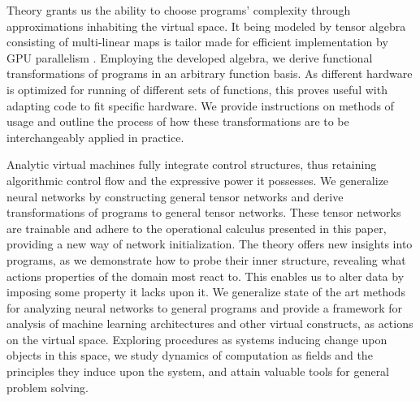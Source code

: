 \documentclass{article}
\begin{document}
Theory grants us the ability to choose programs' complexity through approximations inhabiting the virtual space. It being modeled by tensor algebra consisting of multi-linear maps is tailor made for efficient implementation by GPU parallelism \cite{TensorGPU}. Employing the developed algebra, we derive functional transformations of programs in an arbitrary function basis. 
As different hardware is optimized for running of different sets of functions, this proves useful with adapting code to fit specific hardware.
We provide instructions on methods of usage and outline the process of how these transformations are to be interchangeably applied in practice. 

Analytic virtual machines fully integrate control structures, thus retaining algorithmic control flow and the expressive power it possesses. 
We generalize neural networks by constructing general tensor networks and derive transformations of programs to general tensor networks. These tensor networks are trainable and adhere to the operational calculus presented in this paper, providing a new way of network initialization.
The theory offers new insights into programs, as we demonstrate how to probe their inner structure, revealing what actions properties of the domain most react to. This enables us to alter data by imposing some property it lacks upon it.
We generalize state of the art methods for analyzing neural networks \cite{DeepDream} to general programs and provide a framework for analysis of machine learning architectures and other virtual constructs, as actions on the virtual space. Exploring procedures as systems inducing change upon objects in this space, we study dynamics of computation as fields and the principles they induce upon the system, and attain valuable tools for general problem solving.
\end{document}
